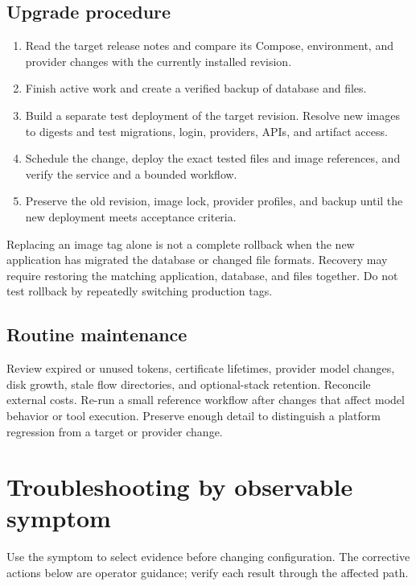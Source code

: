 \documentclass[11pt,letterpaper]{article}
\begin{document}
\subsection{Upgrade procedure}
\begin{enumerate}
\item Read the target release notes and compare its Compose, environment, and
provider changes with the currently installed revision.
\item Finish active work and create a verified backup of database and files.
\item Build a separate test deployment of the target revision. Resolve new
images to digests and test migrations, login, providers, APIs, and artifact access.
\item Schedule the change, deploy the exact tested files and image references,
and verify the service and a bounded workflow.
\item Preserve the old revision, image lock, provider profiles, and backup until
the new deployment meets acceptance criteria.
\end{enumerate}
Replacing an image tag alone is not a complete rollback when the new application
has migrated the database or changed file formats. Recovery may require restoring
the matching application, database, and files together. Do not test rollback
by repeatedly switching production tags.

\subsection{Routine maintenance}
Review expired or unused tokens, certificate lifetimes, provider model changes,
disk growth, stale flow directories, and optional-stack retention. Reconcile
external costs. Re-run a small reference workflow after changes that affect
model behavior or tool execution. Preserve enough detail to distinguish a
platform regression from a target or provider change.

\clearpage
\section{Troubleshooting by observable symptom}
\label{sec:troubleshooting}
Use the symptom to select evidence before changing configuration.
The corrective actions below are operator guidance; verify each result through
the affected path.
\end{document}
